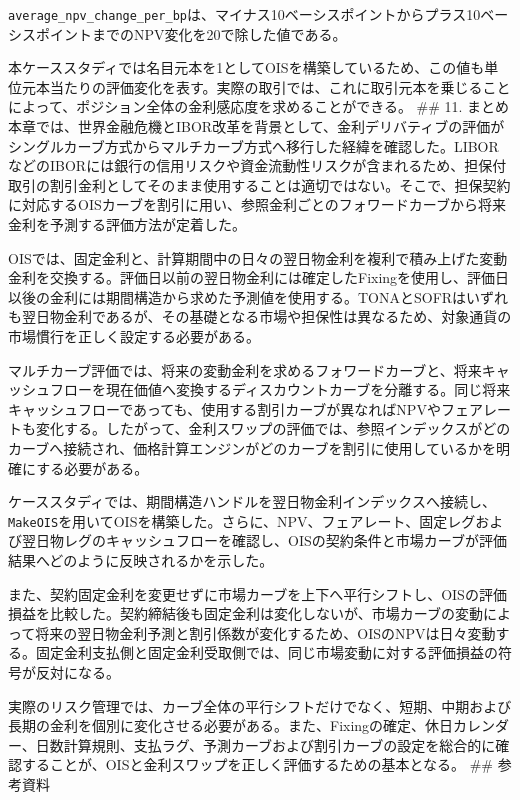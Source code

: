 \documentclass[
  letterpaper,
  DIV=11,
  numbers=noendperiod]{scrreprt}
\begin{document}
\texttt{average\_npv\_change\_per\_bp}は、マイナス10ベーシスポイントからプラス10ベーシスポイントまでのNPV変化を20で除した値である。

本ケーススタディでは名目元本を1としてOISを構築しているため、この値も単位元本当たりの評価変化を表す。実際の取引では、これに取引元本を乗じることによって、ポジション全体の金利感応度を求めることができる。
\#\# 11. まとめ
本章では、世界金融危機とIBOR改革を背景として、金利デリバティブの評価がシングルカーブ方式からマルチカーブ方式へ移行した経緯を確認した。LIBORなどのIBORには銀行の信用リスクや資金流動性リスクが含まれるため、担保付取引の割引金利としてそのまま使用することは適切ではない。そこで、担保契約に対応するOISカーブを割引に用い、参照金利ごとのフォワードカーブから将来金利を予測する評価方法が定着した。

OISでは、固定金利と、計算期間中の日々の翌日物金利を複利で積み上げた変動金利を交換する。評価日以前の翌日物金利には確定したFixingを使用し、評価日以後の金利には期間構造から求めた予測値を使用する。TONAとSOFRはいずれも翌日物金利であるが、その基礎となる市場や担保性は異なるため、対象通貨の市場慣行を正しく設定する必要がある。

マルチカーブ評価では、将来の変動金利を求めるフォワードカーブと、将来キャッシュフローを現在価値へ変換するディスカウントカーブを分離する。同じ将来キャッシュフローであっても、使用する割引カーブが異なればNPVやフェアレートも変化する。したがって、金利スワップの評価では、参照インデックスがどのカーブへ接続され、価格計算エンジンがどのカーブを割引に使用しているかを明確にする必要がある。

ケーススタディでは、期間構造ハンドルを翌日物金利インデックスへ接続し、\texttt{MakeOIS}を用いてOISを構築した。さらに、NPV、フェアレート、固定レグおよび翌日物レグのキャッシュフローを確認し、OISの契約条件と市場カーブが評価結果へどのように反映されるかを示した。

また、契約固定金利を変更せずに市場カーブを上下へ平行シフトし、OISの評価損益を比較した。契約締結後も固定金利は変化しないが、市場カーブの変動によって将来の翌日物金利予測と割引係数が変化するため、OISのNPVは日々変動する。固定金利支払側と固定金利受取側では、同じ市場変動に対する評価損益の符号が反対になる。

実際のリスク管理では、カーブ全体の平行シフトだけでなく、短期、中期および長期の金利を個別に変化させる必要がある。また、Fixingの確定、休日カレンダー、日数計算規則、支払ラグ、予測カーブおよび割引カーブの設定を総合的に確認することが、OISと金利スワップを正しく評価するための基本となる。
\#\# 参考資料
\end{document}
